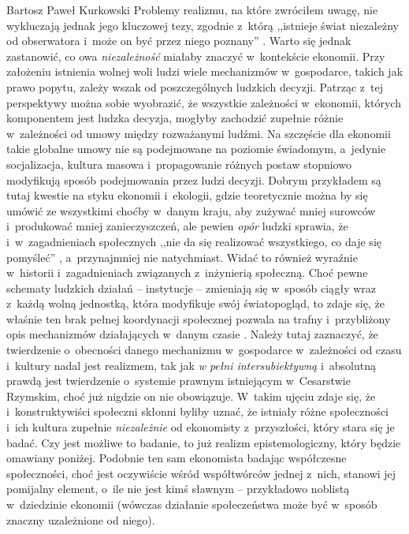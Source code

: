 \begin{artplenv}{Bartosz Paweł Kurkowski}
Problemy realizmu, na które zwróciłem uwagę, nie wykluczają jednak jego kluczowej tezy, zgodnie z~którą ,,istnieje świat
niezależny od obserwatora i~może on być przez niego poznany''
\parencite[s.~16]{hardt_studia_2013}.
Warto się
jednak zastanowić, co owa \textit{niezależność} miałaby znaczyć w~kontekście ekonomii. Przy założeniu istnienia wolnej
woli ludzi wiele mechanizmów w~gospodarce, takich jak prawo popytu, zależy wszak od poszczególnych ludzkich decyzji.
Patrząc z~tej perspektywy można sobie wyobrazić, że wszystkie zależności w~ekonomii, których komponentem jest ludzka
decyzja, mogłyby zachodzić zupełnie różnie w~zależności od umowy między rozważanymi ludźmi. Na szczęście dla ekonomii
takie globalne umowy nie są podejmowane na poziomie świadomym, a~jedynie socjalizacja, kultura masowa i~propagowanie
różnych postaw stopniowo modyfikują sposób podejmowania przez ludzi decyzji. Dobrym przykładem są tutaj kwestie na
styku ekonomii i~ekologii, gdzie teoretycznie można by się umówić ze wszystkimi choćby w~danym kraju, aby zużywać mniej
surowców i~produkować mniej zanieczyszczeń, ale pewien \textit{opór} ludzki sprawia, że i~w~zagadnieniach społecznych
,,nie da się realizować wszystkiego, co daje się pomyśleć''
\parencite[s.~42]{zboron_teorie_2009},
a~przynajmniej nie natychmiast. Widać to również wyraźnie w~historii i~zagadnieniach związanych z~inżynierią społeczną.
Choć pewne schematy ludzkich działań -- instytucje -- zmieniają się w~sposób ciągły wraz z~każdą wolną jednostką, która
modyfikuje swój światopogląd, to zdaje się, że właśnie ten brak pełnej koordynacji społecznej pozwala na
trafny i~przybliżony opis mechanizmów działających w~danym czasie
\parencite[s.~21]{hardt_studia_2013}.
Należy
tutaj zaznaczyć, że twierdzenie o~obecności danego mechanizmu w~gospodarce w~zależności od czasu i~kultury nadal jest
realizmem, tak jak \textit{w pełni intersubiektywną} i~absolutną prawdą jest twierdzenie o~systemie prawnym istniejącym
w~Cesarstwie Rzymskim, choć już nigdzie on nie obowiązuje. W~takim ujęciu zdaje się, że i~konstruktywiści społeczni
skłonni byliby uznać, że istniały różne społeczności i~ich kultura zupełnie \textit{niezależnie} od
ekonomisty z~przyszłości, który stara się je badać. Czy jest możliwe to badanie, to już realizm epistemologiczny, %
który będzie
omawiany poniżej. Podobnie ten sam ekonomista badając współczesne społeczności, choć jest oczywiście wśród współtwórców
jednej z~nich, stanowi jej pomijalny element, o~ile nie jest kimś sławnym -- przykładowo noblistą w~dziedzinie ekonomii
(wówczas działanie społeczeństwa może być w~sposób znaczny uzależnione od niego).



\end{artplenv}
